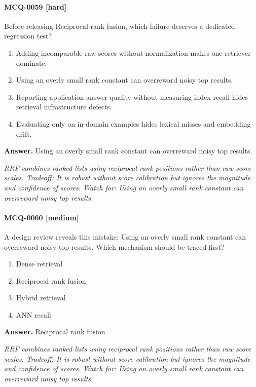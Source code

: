 \paragraph{MCQ-0059 [hard]} Before releasing Reciprocal rank fusion, which failure deserves a dedicated regression test?
\begin{enumerate}[label=\Alph*.]
\item Adding incomparable raw scores without normalization makes one retriever dominate.
\item Using an overly small rank constant can overreward noisy top results.
\item Reporting application answer quality without measuring index recall hides retrieval infrastructure defects.
\item Evaluating only on in-domain examples hides lexical misses and embedding drift.
\end{enumerate}
\noindent\textbf{Answer.} Using an overly small rank constant can overreward noisy top results.
\par\textit{RRF combines ranked lists using reciprocal rank positions rather than raw score scales. Tradeoff: It is robust without score calibration but ignores the magnitude and confidence of scores. Watch for: Using an overly small rank constant can overreward noisy top results.}
\paragraph{MCQ-0060 [medium]} A design review reveals this mistake: Using an overly small rank constant can overreward noisy top results. Which mechanism should be traced first?
\begin{enumerate}[label=\Alph*.]
\item Dense retrieval
\item Reciprocal rank fusion
\item Hybrid retrieval
\item ANN recall
\end{enumerate}
\noindent\textbf{Answer.} Reciprocal rank fusion
\par\textit{RRF combines ranked lists using reciprocal rank positions rather than raw score scales. Tradeoff: It is robust without score calibration but ignores the magnitude and confidence of scores. Watch for: Using an overly small rank constant can overreward noisy top results.}
